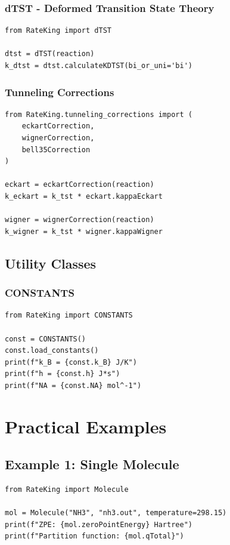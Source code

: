\documentclass[11pt,a4paper]{book}
\begin{document}
\subsection{dTST - Deformed Transition State Theory}

\begin{lstlisting}
from RateKing import dTST

dtst = dTST(reaction)
k_dtst = dtst.calculateKDTST(bi_or_uni='bi')
\end{lstlisting}

\subsection{Tunneling Corrections}

\begin{lstlisting}
from RateKing.tunneling_corrections import (
    eckartCorrection,
    wignerCorrection,
    bell35Correction
)

eckart = eckartCorrection(reaction)
k_eckart = k_tst * eckart.kappaEckart

wigner = wignerCorrection(reaction)
k_wigner = k_tst * wigner.kappaWigner
\end{lstlisting}

\section{Utility Classes}

\subsection{CONSTANTS}

\begin{lstlisting}
from RateKing import CONSTANTS

const = CONSTANTS()
const.load_constants()
print(f"k_B = {const.k_B} J/K")
print(f"h = {const.h} J*s")
print(f"NA = {const.NA} mol^-1")
\end{lstlisting}

\chapter{Practical Examples}

\section{Example 1: Single Molecule}

\begin{lstlisting}
from RateKing import Molecule

mol = Molecule("NH3", "nh3.out", temperature=298.15)
print(f"ZPE: {mol.zeroPointEnergy} Hartree")
print(f"Partition function: {mol.qTotal}")
\end{lstlisting}
\end{document}
